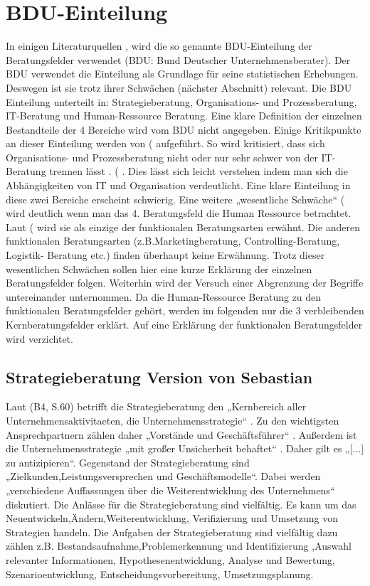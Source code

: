 \section{BDU-Einteilung}
In einigen Literaturquellen \cite[54]{Lippold201309},\cite[4]{nissen2007consulting} wird die so genannte BDU-Einteilung der Beratungsfelder verwendet (BDU: Bund Deutscher Unternehmensberater). Der BDU verwendet die Einteilung als Grundlage für seine statistischen Erhebungen. Deswegen ist sie trotz ihrer Schwächen (nächster Abschnitt) relevant.
Die BDU Einteilung unterteilt in: Strategieberatung, Organisations- und Prozessberatung, IT-Beratung und Human-Ressource Beratung. Eine klare Definition der einzelnen Bestandteile der 4 Bereiche wird vom BDU nicht angegeben. Einige Kritikpunkte an dieser Einteilung werden von (\cite[54]{Lippold201309} aufgeführt. So wird kritisiert, \glqq [...] dass sich Organisations- und Prozessberatung nicht oder nur sehr schwer von der IT-Beratung trennen l\"asst \grqq. (\cite[54]{Lippold201309} . Dies lässt sich leicht verstehen indem man sich die Abhängigkeiten von IT und Organisation verdeutlicht. Eine klare Einteilung in diese zwei Bereiche erscheint schwierig. Eine weitere „wesentliche Schwäche“ (\cite[54]{Lippold201309}  wird deutlich wenn man das 4. Beratungsfeld die Human Ressource betrachtet. Laut (\cite[54]{Lippold201309} wird sie als einzige der funktionalen Beratungsarten erwähnt. Die anderen funktionalen Beratungsarten (z.B.Marketingberatung, Controlling-Beratung, Logistik- Beratung etc.) finden überhaupt keine Erwähnung.
Trotz dieser wesentlichen Schwächen sollen hier eine kurze Erklärung der einzelnen Beratungsfelder folgen. Weiterhin wird der Versuch einer Abgrenzung der Begriffe untereinander unternommen. Da die Human-Ressource Beratung zu den funktionalen Beratungsfelder gehört, werden im folgenden nur die 3 verbleibenden Kernberatungsfelder erklärt. Auf eine Erklärung der funktionalen Beratungsfelder wird verzichtet. 

\subsection{Strategieberatung Version von Sebastian}
Laut (B4, S.60) betrifft die Strategieberatung den „Kernbereich aller Unternehmensaktivitaeten, die Unternehmensstrategie“ . Zu den wichtigsten Ansprechpartnern zählen daher „Vorstände und Geschäftsführer“ . Außerdem ist die Unternehmensstrategie „mit großer Unsicherheit behaftet“ . Daher gilt es „[...] zu antizipieren“.  Gegenstand der Strategieberatung sind „Zielkunden,Leistungsversprechen und Geschäftsmodelle“. Dabei werden „verschiedene Auffassungen über die Weiterentwicklung des Unternehmens“ diskutiert.
Die Anlässe für die Strategieberatung sind vielfältig. Es kann um das Neuentwickeln,Ändern,Weiterentwicklung, Verifizierung und Umsetzung von Strategien handeln.
Die Aufgaben der Strategieberatung sind vielfältig dazu zählen z.B. Bestandsaufnahme,Problemerkennung und Identifizierung ,Auswahl relevanter Informationen, Hypothesenentwicklung, Analyse und Bewertung, Szenarioentwicklung, Entscheidungsvorbereitung, Umsetzungsplanung.

